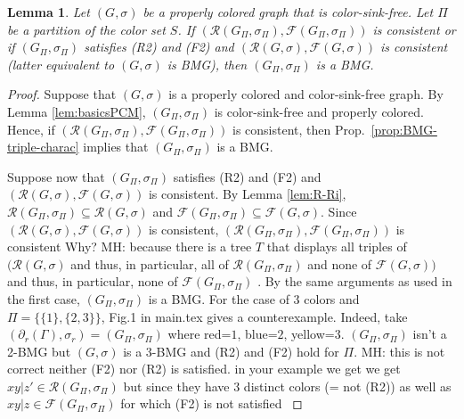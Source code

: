 \documentclass[final,3p,times]{elsarticle}
\newtheorem{lemma}[theorem]{Lemma}%
\newcommand{\ak}[1]{\begingroup\color{orange}#1\endgroup}
\newcommand{\OLD}[1]{\begingroup\tiny\color{gray}#1\endgroup}
\newcommand{\mh}[1]{\begingroup\color{blue}#1\endgroup}
\begin{document}
\begin{lemma}
    Let $(G,\sigma)$ be a properly colored graph that is color-sink-free. Let
    $\Pi$ be a partition of the color set $S$. If 
    $(\mathscr{R}(G_\Pi,\sigma_\Pi),
    \mathscr{F}(G_\Pi,\sigma_\Pi))$ is consistent or if 
    $(G_\Pi,\sigma_\Pi)$ 
    satisfies (R2) and (F2) and $(\mathscr{R}(G,\sigma),
    \mathscr{F}(G,\sigma))$ is consistent (latter equivalent to $(G,\sigma)$  is BMG), 
    then $(G_\Pi,\sigma_\Pi)$ is a BMG. 
\end{lemma}
\begin{proof}
    Suppose that $(G,\sigma)$ is a properly colored and color-sink-free graph.
   By Lemma \ref{lem:basicsPCM}, $(G_\Pi,\sigma_\Pi)$ is color-sink-free and
   properly colored. Hence, if $(\mathscr{R}(G_\Pi,\sigma_\Pi),
   \mathscr{F}(G_\Pi,\sigma_\Pi))$ is consistent, then Prop.\
   \ref{prop:BMG-triple-charac} implies that $(G_\Pi,\sigma_\Pi)$ is a BMG. 
     
    Suppose now that $(G_\Pi,\sigma_\Pi)$ satisfies (R2) and (F2) and
    $(\mathscr{R}(G,\sigma), \mathscr{F}(G,\sigma))$ is consistent. By Lemma
    \ref{lem:R-Ri}, $\mathscr{R}(G_\Pi,\sigma_\Pi) \subseteq
    \mathscr{R}(G,\sigma)$ and $\mathscr{F}(G_\Pi,\sigma_\Pi) \subseteq
    \mathscr{F}(G,\sigma)$. Since $(\mathscr{R}(G,\sigma),
    \mathscr{F}(G,\sigma))$ is consistent, $(\mathscr{R}(G_\Pi,\sigma_\Pi)
    ,\mathscr{F}(G_\Pi,\sigma_\Pi) )$ is consistent \OLD{ \ak{Why?}
    \mh{MH: because there is a tree $T$ that displays all triples of 
    $(\mathscr{R}(G,\sigma)$ and thus, in particular, all of $\mathscr{R}(G_\Pi,\sigma_\Pi)$ 
    and none of $\mathscr{F}(G,\sigma))$ and thus, in particular, 
    none of $\mathscr{F}(G_\Pi,\sigma_\Pi)$
    }}. By the same arguments as
    used in the first case, $(G_\Pi,\sigma_\Pi)$ is a BMG. 
    \OLD{\ak{For the case of $3$ colors and $\Pi=\{\{1\},\{2,3\}\}$, Fig.1 in main.tex gives a counterexample. 
    Indeed, take $(\partial_r(\Gamma),\sigma_r)=(G_{\Pi},\sigma_\Pi)$ where red=$1$, blue=$2$, yellow=$3$. $(G_{\Pi},\sigma_\Pi)$ isn't a 2-BMG but $(G,\sigma)$ is a 3-BMG and (R2) and (F2) hold for $\Pi$.
    \mh{MH: this is not correct neither (F2) nor (R2) is satisfied. in your example we get
    we get $xy|z'\in \mathscr{R}(G_\Pi,\sigma_\Pi)$ but since they have 3 distinct colors (= not (R2))
   	as well as $xy|z\in \mathscr{F}(G_\Pi,\sigma_\Pi)$ for which (F2) is not satisfied}
    }}
\end{proof}
\end{document}
